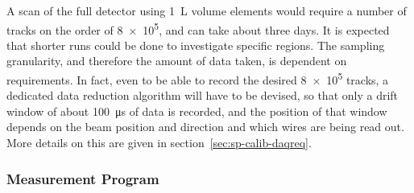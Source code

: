 A scan of the full detector using \SI{1}{L} volume elements would require a number of tracks on the order of \num{8e5}, 
and can take about three days. It is expected that shorter runs could be done to investigate specific regions. The sampling granularity, and therefore the amount of data taken, is dependent on  requirements. In fact, even to be able to record the desired \num{8e5} tracks, a dedicated data reduction algorithm will have to be devised, so that only a drift window of about \SI{100}{\micro\s}
of data is recorded, and the position of that window depends on the beam position and direction and which wires are being read out. More details on this are given in section~\ref{sec:sp-calib-daqreq}.






\subsubsection{Measurement Program}
\label{sec:sp-calib-sys-las-ion-meas}



